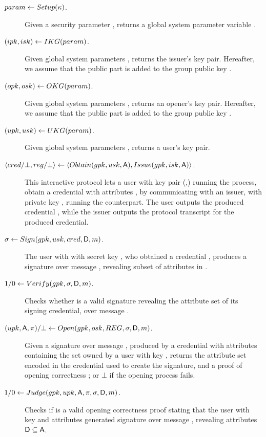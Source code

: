 \begin{description}
\item[$param \gets Setup(\kappa)$.] Given a security parameter \secpar,
  returns a global system parameter variable \parm.
\item[$(ipk,isk) \gets IKG(param)$.] Given global system parameters
  \parm, returns the issuer's key pair. Hereafter, we assume that the public
  part \ipk is added to the group public key \gpk.
\item[$(opk,osk) \gets OKG(param)$.] Given global system parameters
  \parm, returns an opener's key pair. Hereafter, we assume that the public part
  \opk is added to the group public key \gpk.
\item[$(upk,usk) \gets UKG(param)$.] Given global system parameters
  \parm, returns a user's key pair.
\item[$\langle cred/\bot,reg/\bot \rangle \gets
  \langle Obtain(gpk,usk,\mathsf{A}),Issue(gpk,isk,\mathsf{A}) \rangle$.]
  This interactive protocol lets a user with key pair (\upk,\usk) running the
  \Obtain process, obtain a credential \cred with attributes \Attrs, by
  communicating with an issuer, with private key \isk, running the \Issue
  counterpart. The user outputs the produced credential \cred, while the issuer
  outputs the protocol transcript \utrans for the produced credential.
\item[$\sigma \gets Sign(gpk,usk,cred,\mathsf{D},m)$.] The user with
  with secret key \usk, who obtained a credential \cred, produces a signature
  \sig over message \msg, revealing subset of attributes \DAttrs in \cred.
\item[$1/0 \gets Verify(gpk,\sigma,\mathsf{D},m)$.] Checks whether \sig is a
  valid signature revealing the attribute set \DAttrs of its signing credential,
  over message \msg.
\item[$(\upk,\Attrs,\oproof)/\bot \gets
  \Open(\gpk,\osk,\trans,\sig,\DAttrs,\msg)$.]
  Given a signature \sig over message \msg, produced by a credential with
  attributes containing the set \DAttrs owned by a user with key \upk, returns
  the attribute set \Attrs encoded in the credential used to create the
  signature, and a proof of opening correctness \oproof; or $\bot$ if the
  opening process fails.
\item[$1/0 \gets Judge(gpk,upk,\mathsf{A},\pi,\sigma,\mathsf{D},
  m)$.] Checks if \oproof is a valid opening correctness proof stating that
  the user with key \upk and attributes \Attrs generated signature \sig over
  message \msg, revealing attributes $\mathsf{D} \subseteq \mathsf{A}$. 
\end{description}

